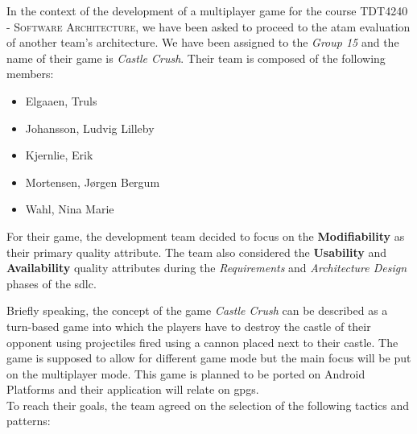 In the context of the development of a multiplayer game for the course \textsc{TDT4240 - Software Architecture}, we have been asked to proceed to the \gls{atam} evaluation of another team's architecture. We have been assigned to the \textit{Group 15} and the name of their game is \textit{Castle Crush}. Their team is composed of the following members:
\begin{itemize}
  \item Elgaaen, Truls
  \item Johansson, Ludvig Lilleby
  \item Kjernlie, Erik
  \item Mortensen, J{\o}rgen Bergum
  \item Wahl, Nina Marie
\end{itemize}
For their game, the development team decided to focus on the \textbf{Modifiability} as their primary quality attribute. The team also considered the \textbf{Usability} and \textbf{Availability} quality attributes during the \textit{Requirements} and \textit{Architecture Design} phases of the \gls{sdlc}.

Briefly speaking, the concept of the game \textit{Castle Crush} can be described as a turn-based game into which the players have to destroy the castle of their opponent using projectiles fired using a cannon placed next to their castle. The game is supposed to allow for different game mode but the main focus will be put on the multiplayer mode. This game is planned to be ported on Android Platforms and their application will relate on \gls{gpgs}. \\

\newpage
To reach their goals, the team agreed on the selection of the following tactics and patterns: \\

